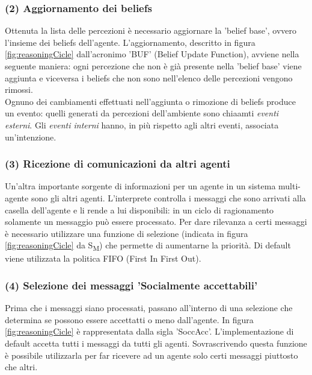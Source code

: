 \documentclass[12pt,a4paper,openright,twoside]{report}
\begin{document}
\subsubsection{(2) Aggiornamento dei beliefs}
Ottenuta la lista delle percezioni \`e necessario aggiornare la 'belief base', ovvero l'insieme dei beliefs dell'agente. L'aggiornamento, descritto in figura \ref{fig:reasoningCicle} dall'acronimo 'BUF' (Belief Update Function), avviene nella seguente maniera: ogni percezione che non \`e gi\`a presente nella 'belief base' viene aggiunta e viceversa i beliefs che non sono nell'elenco delle percezioni vengono rimossi.
\\
Ognuno dei cambiamenti effettuati nell'aggiunta o rimozione di beliefs produce un evento: quelli generati da percezioni dell'ambiente sono chiaamti \textit{eventi esterni}. Gli \textit{eventi interni} hanno, in pi\`u rispetto agli altri eventi, associata un'intenzione.


\subsubsection{(3) Ricezione di comunicazioni da altri agenti}
Un'altra importante sorgente di informazioni per un agente in un sistema multi-agente sono gli altri agenti. L'interprete controlla i messaggi che sono arrivati alla casella dell'agente e li rende a lui disponibili: in un ciclo di ragionamento solamente un messaggio pu\`o essere processato. Per dare rilevanza a certi messaggi \`e necessario utilizzare una funzione di selezione (indicata in figura \ref{fig:reasoningCicle} da S\textsubscript{M}) che permette di aumentarne la priorit\`a. Di default viene utilizzata la politica FIFO (First In First Out).


\subsubsection{(4) Selezione dei messaggi 'Socialmente accettabili'}
Prima che i messaggi siano processati, passano all'interno di una selezione che determina se possono essere accettatti o meno dall'agente. In figura \ref{fig:reasoningCicle} \`e rappresentata dalla sigla 'SoccAcc'. L'implementazione di default accetta tutti i messaggi da tutti gli agenti. Sovrascrivendo questa funzione \`e possibile utilizzarla per far ricevere ad un agente solo certi messaggi piuttosto che altri.
\end{document}

